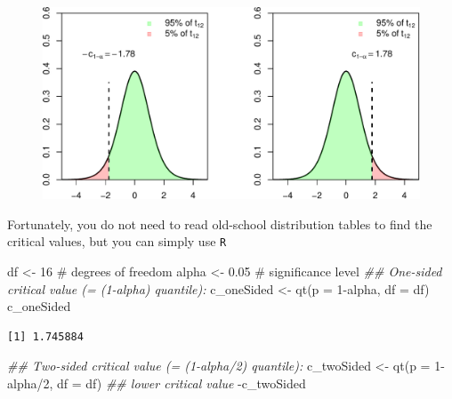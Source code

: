 \documentclass[
  letterpaper,
  DIV=11,
  numbers=noendperiod]{scrreprt}
\newenvironment{Shaded}{\begin{snugshade}}{\end{snugshade}}
\newcommand{\AttributeTok}[1]{\textcolor[rgb]{0.40,0.45,0.13}{#1}}
\newcommand{\CommentTok}[1]{\textcolor[rgb]{0.37,0.37,0.37}{#1}}
\newcommand{\DecValTok}[1]{\textcolor[rgb]{0.68,0.00,0.00}{#1}}
\newcommand{\DocumentationTok}[1]{\textcolor[rgb]{0.37,0.37,0.37}{\textit{#1}}}
\newcommand{\FloatTok}[1]{\textcolor[rgb]{0.68,0.00,0.00}{#1}}
\newcommand{\FunctionTok}[1]{\textcolor[rgb]{0.28,0.35,0.67}{#1}}
\newcommand{\NormalTok}[1]{\textcolor[rgb]{0.00,0.23,0.31}{#1}}
\newcommand{\OtherTok}[1]{\textcolor[rgb]{0.00,0.23,0.31}{#1}}
\newcommand{\SpecialCharTok}[1]{\textcolor[rgb]{0.37,0.37,0.37}{#1}}
\theoremstyle{definition}
\theoremstyle{plain}
\theoremstyle{plain}
\theoremstyle{remark}
\begin{document}
\begin{figure}

{\centering \includegraphics{./05-Small-Sample-Inference_files/figure-pdf/unnamed-chunk-7-1.pdf}

}

\end{figure}

Fortunately, you do not need to read old-school distribution tables to
find the critical values, but you can simply use \texttt{R}

\begin{Shaded}
\begin{Highlighting}[]
\NormalTok{df    }\OtherTok{\textless{}{-}} \DecValTok{16}   \CommentTok{\# degrees of freedom }
\NormalTok{alpha }\OtherTok{\textless{}{-}} \FloatTok{0.05} \CommentTok{\# significance level}
\DocumentationTok{\#\# One{-}sided critical value (= (1{-}alpha) quantile):}
\NormalTok{c\_oneSided }\OtherTok{\textless{}{-}} \FunctionTok{qt}\NormalTok{(}\AttributeTok{p =} \DecValTok{1}\SpecialCharTok{{-}}\NormalTok{alpha, }\AttributeTok{df =}\NormalTok{ df)}
\NormalTok{c\_oneSided}
\end{Highlighting}
\end{Shaded}

\begin{verbatim}
[1] 1.745884
\end{verbatim}

\begin{Shaded}
\begin{Highlighting}[]
\DocumentationTok{\#\# Two{-}sided critical value (= (1{-}alpha/2) quantile):}
\NormalTok{c\_twoSided }\OtherTok{\textless{}{-}} \FunctionTok{qt}\NormalTok{(}\AttributeTok{p =} \DecValTok{1}\SpecialCharTok{{-}}\NormalTok{alpha}\SpecialCharTok{/}\DecValTok{2}\NormalTok{, }\AttributeTok{df =}\NormalTok{ df)}
\DocumentationTok{\#\# lower critical value}
\SpecialCharTok{{-}}\NormalTok{c\_twoSided}
\end{Highlighting}
\end{Shaded}
\end{document}
